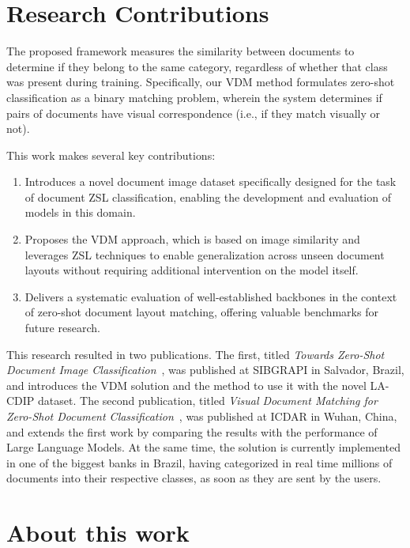 \section{Research Contributions}

The proposed framework measures the similarity between documents to determine if they belong to the same category, regardless of whether that class was present during training. Specifically, our \acrfull{VDM} method formulates zero-shot classification as a binary matching problem, wherein the system determines if pairs of documents have visual correspondence (i.e., if they match visually or not).

This work makes several key contributions:
\begin{enumerate}
    \item Introduces a novel document image dataset specifically designed for the task of document \gls{ZSL} classification, enabling the development and evaluation of models in this domain.
    \item Proposes the \gls{VDM} approach, which is based on image similarity and leverages \gls{ZSL} techniques to enable generalization across unseen document layouts without requiring additional intervention on the model itself.
    \item Delivers a systematic evaluation of well-established backbones in the context of zero-shot document layout matching, offering valuable benchmarks for future research.
\end{enumerate}

This research resulted in two publications. The first, titled \textit{Towards Zero-Shot Document Image Classification}~\cite{11223349}, was published at SIBGRAPI in Salvador, Brazil, and introduces the \gls{VDM} solution and the method to use it with the novel \gls{LA-CDIP} dataset. The second publication, titled \textit{Visual Document Matching for Zero-Shot Document Classification}~\cite{10.1007/978-3-032-09368-4_12}, was published at ICDAR in Wuhan, China, and extends the first work by comparing the results with the performance of Large Language Models. At the same time, the solution is currently implemented in one of the biggest banks in Brazil, having categorized in real time millions of documents into their respective classes, as soon as they are sent by the users.


\section{About this work}

